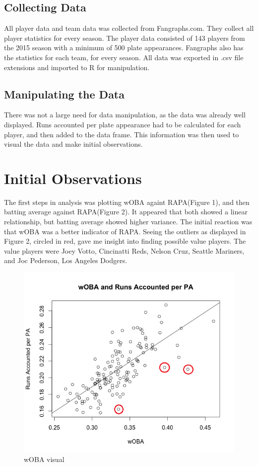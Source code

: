 \documentclass[12pt]{article}
\begin{document}
\subsection{Collecting Data}


\qquad All player data and team data was collected from Fangraphs.com. They collect all player statistics for every season. The player data consisted of 143 players from the 2015 season with a minimum of 500 plate appearances\cite{fangraphs}. Fangraphs also has the statistics for each team, for every season. All data was exported in .csv file extensions and imported to R for manipulation.


\subsection{Manipulating the Data}

\qquad There was not a large need for data manipulation, as the data was already well displayed. Runs accounted per plate appearance had to be calculated for each player, and then added to the data frame. This information was then used to visual the data and make initial observations.


\section{Initial Observations}

\qquad The first steps in analysis was plotting wOBA againt RAPA(Figure 1), and then batting average against RAPA(Figure 2). It appeared that both showed a linear relationship, but batting average showed higher variance. The initial reaction was that wOBA was a better indicator of RAPA. Seeing the outliers as displayed in Figure 2, circled in red, gave me insight into finding possible value players. The value players were Joey Votto, Cincinatti Reds, Nelson Cruz, Seattle Mariners, and Joc Pederson, Los Angeles Dodgers. 

\begin{figure}[h]
\centering
\includegraphics[width=4.5in]{wOBA.png}
\caption{wOBA visual}
\end{figure}
\end{document}
